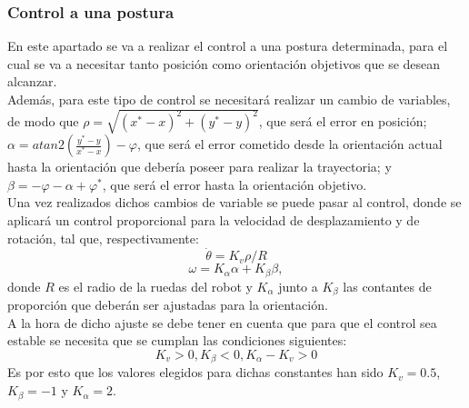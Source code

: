\documentclass[a4paper,twoside]{article}
\begin{document}
	
	\subsubsection{Control a una postura}
	En este apartado se va a realizar el control a una postura determinada, para el cual se va a necesitar tanto posición como orientación objetivos que se desean alcanzar.\\
	Además, para este tipo de control se necesitará realizar un cambio de variables, de modo que $\rho=\sqrt{(x^*-x)^2+(y^*-y)^2}$, que será el error en posición; $\alpha=atan2(\frac{y^*-y}{x^*-x})-\varphi$, que será el error cometido desde la orientación actual hasta la orientación que debería poseer para realizar la trayectoria; y $\beta=-\varphi-\alpha+\varphi^*$, que será el error hasta la orientación objetivo.\\
	
	Una vez realizados dichos cambios de variable se puede pasar al control, donde se aplicará un control proporcional para la velocidad de desplazamiento y de rotación, tal que, respectivamente:
	\begin{equation}
	\dot{\theta}=K_v\rho/R
	\end{equation} 
	\begin{equation}
	\omega=K_{\alpha}\alpha+K_{\beta}\beta,
	\end{equation} 
	donde $R$ es el radio de la ruedas del robot y $K_{\alpha}$ junto a $K_{\beta}$ las contantes de proporción que deberán ser ajustadas para la orientación.\\
	A la hora de dicho ajuste se debe tener en cuenta que para que el control sea estable se necesita que se cumplan las condiciones siguientes:
	\begin{equation}
	K_v>0, K_{\beta}<0,K_{\alpha}-K_v>0 
	\end{equation} 
	Es por esto que los valores elegidos para dichas constantes han sido $K_v=0.5$, $K_{\beta}=-1$ y $K_{\alpha}=2$.\\
	
\end{document}

